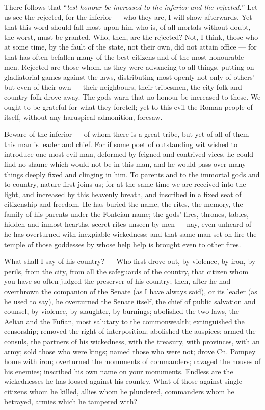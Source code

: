 There follows that ``\textit{lest honour be increased to the inferior and the rejected.}'' Let us see the rejected, for the inferior --- who they are, I will show afterwards. Yet that this word should fall most upon him who is, of all mortals without doubt, the worst, must be granted. Who, then, are the rejected? Not, I think, those who at some time, by the fault of the state, not their own, did not attain office --- for that has often befallen many of the best citizens and of the most honourable men. Rejected are those whom, as they were advancing to all things, putting on gladiatorial games against the laws, distributing most openly not only of others' but even of their own --- their neighbours, their tribesmen, the city-folk and country-folk drove away. The gods warn that no honour be increased to these. We ought to be grateful for what they foretell; yet to this evil the Roman people of itself, without any haruspical admonition, foresaw.

 Beware of the inferior --- of whom there is a great tribe, but yet of all of them this man is leader and chief. For if some poet of outstanding wit wished to introduce one most evil man, deformed by feigned and contrived vices, he could find no shame which would not be in this man, and he would pass over many things deeply fixed and clinging in him. To parents and to the immortal gods and to country, nature first joins us; for at the same time we are received into the light, and increased by this heavenly breath, and inscribed in a fixed seat of citizenship and freedom. He has buried the name, the rites, the memory, the family of his parents under the Fonteian name; the gods' fires, thrones, tables, hidden and inmost hearths, secret rites unseen by men --- nay, even unheard of --- he has overturned with inexpiable wickedness; and that same man set on fire the temple of those goddesses by whose help help is brought even to other fires.

 What shall I say of his country? --- Who first drove out, by violence, by iron, by perils, from the city, from all the safeguards of the country, that citizen whom you have so often judged the preserver of his country; then, after he had overthrown the companion of the Senate (as I have always said), or its leader (as he used to say), he overturned the Senate itself, the chief of public salvation and counsel, by violence, by slaughter, by burnings; abolished the two laws, the Aelian and the Fufian, most salutary to the commonwealth; extinguished the censorship; removed the right of interposition; abolished the auspices; armed the consuls, the partners of his wickedness, with the treasury, with provinces, with an army; sold those who were kings; named those who were not; drove Cn. Pompey home with iron; overturned the monuments of commanders; ravaged the houses of his enemies; inscribed his own name on your monuments. Endless are the wickednesses he has loosed against his country. What of those against single citizens whom he killed, allies whom he plundered, commanders whom he betrayed, armies which he tampered with?

